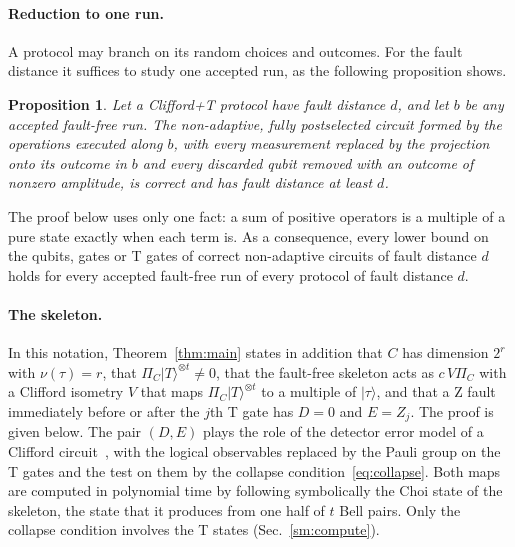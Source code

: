 \documentclass[aps,prl,reprint,twocolumn,amsmath,amssymb,floatfix,nofootinbib,superscriptaddress]{revtex4-2}
\newtheorem{proposition}[theorem]{Proposition}
\theoremstyle{definition}
\theoremstyle{remark}
\begin{document}
\paragraph*{Reduction to one run.}
A protocol may branch on its random choices and outcomes. For the fault distance it suffices to study one accepted run, as the following proposition shows.
\begin{proposition}\label{prop:branch}
Let a Clifford+T protocol have fault distance $d$, and let $b$ be any accepted fault-free run. The non-adaptive, fully postselected circuit formed by the operations executed along $b$, with every measurement replaced by the projection onto its outcome in $b$ and every discarded qubit removed with an outcome of nonzero amplitude, is correct and has fault distance at least $d$.
\end{proposition}
The proof below uses only one fact: a sum of positive operators is a multiple of a pure state exactly when each term is. As a consequence, every lower bound on the qubits, gates or T gates of correct non-adaptive circuits of fault distance $d$ holds for every accepted fault-free run of every protocol of fault distance $d$.

\paragraph*{The skeleton.}
In this notation, Theorem~\ref{thm:main} states in addition that $C$ has dimension $2^r$ with $\nu(\tau)=r$, that $\Pi_C|T\rangle^{\otimes t}\neq0$, that the fault-free skeleton acts as $c\,V\Pi_C$ with a Clifford isometry $V$ that maps $\Pi_C|T\rangle^{\otimes t}$ to a multiple of $|\tau\rangle$, and that a Z fault immediately before or after the $j$th T gate has $D=0$ and $E=Z_j$. The proof is given below. The pair $(D,E)$ plays the role of the detector error model of a Clifford circuit~\cite{stim,delfossepaetznick,bombinzx}, with the logical observables replaced by the Pauli group on the T gates and the test on them by the collapse condition~\eqref{eq:collapse}. Both maps are computed in polynomial time by following symbolically the Choi state of the skeleton, the state that it produces from one half of $t$ Bell pairs. Only the collapse condition involves the T states (Sec.~\ref{sm:compute}).
\end{document}
